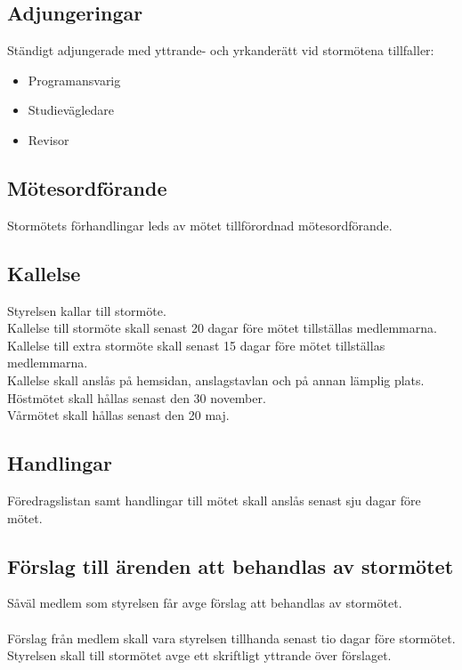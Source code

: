 \documentclass[a4paper]{article}
\begin{document}
{{  \subsection{Adjungeringar}
  Ständigt adjungerade med yttrande- och yrkanderätt vid stormötena tillfaller: 
  \begin{itemize}
  \item Programansvarig 
  \item Studievägledare
  \item Revisor
  \end{itemize}
  \subsection{Mötesordförande}
  Stormötets förhandlingar leds av mötet tillförordnad mötesordförande.
  \subsection{Kallelse}
  Styrelsen kallar till stormöte.\\
  Kallelse till stormöte skall senast 20 dagar före mötet tillställas medlemmarna.\\
  Kallelse till extra stormöte skall senast 15 dagar före mötet tillställas medlemmarna.\\
  Kallelse skall anslås på hemsidan, anslagstavlan och på annan lämplig plats.\\
  Höstmötet skall hållas senast den 30 november.\\
  Vårmötet skall hållas senast den 20 maj.
  \subsection{Handlingar}
  Föredragslistan samt handlingar till mötet skall anslås senast sju dagar före mötet.
  \subsection{Förslag till ärenden att behandlas av stormötet}
  Såväl medlem som styrelsen får avge förslag att behandlas av stormötet.\\
  \\
Förslag från medlem skall vara styrelsen tillhanda senast tio dagar före stormötet. Styrelsen skall till stormötet avge ett skriftligt yttrande över förslaget.
}}
\end{document}
